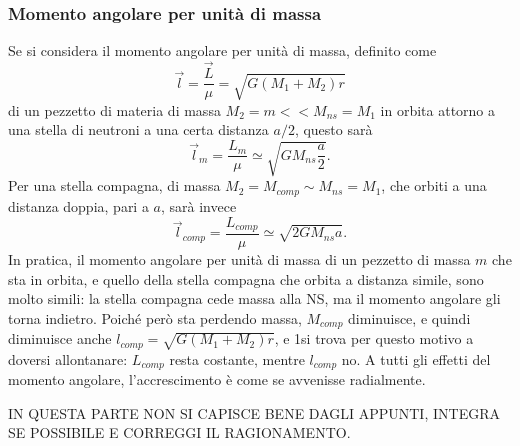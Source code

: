 \subsubsection{Momento angolare per unità di massa}
Se si considera il momento angolare per unità di massa, definito come
\begin{equation}
    \vec{l} = \frac{\vec{L}}{\mu} = \sqrt{G(M_1+M_2)r}
\end{equation}
di un pezzetto di materia di massa $M_2=m << M_{ns}=M_1$ in orbita attorno a una stella di neutroni a una certa distanza $a/2$, questo sarà
\begin{equation}
    \vec{l}_m = \frac{L_m}{\mu}\simeq \sqrt{GM_{ns}\frac{a}{2}}.
\end{equation}
Per una stella compagna, di massa $M_2 = M_{comp} \sim M_{ns} = M_1 $, che orbiti a una distanza doppia, pari a $a$, sarà invece
\begin{equation}
    \vec{l}_{comp} = \frac{L_{comp}}{\mu} \simeq \sqrt{2GM_{ns}a}.
\end{equation}
In pratica, il momento angolare per unità di massa di un pezzetto di massa $m$ che sta in orbita, e quello della stella compagna che orbita a distanza simile, sono molto simili: 
la stella compagna cede massa alla NS, ma il momento angolare gli torna indietro. Poiché però sta perdendo massa, $M_{comp}$ diminuisce, e quindi diminuisce anche $l_{comp} = \sqrt{G(M_1+M_2)r} $, e 1si trova per questo motivo a doversi allontanare: $L_{comp} $ resta costante, mentre $l_{comp} $ no.
A tutti gli effetti del momento angolare, l'accrescimento è come se avvenisse radialmente.

IN QUESTA PARTE NON SI CAPISCE BENE DAGLI APPUNTI, INTEGRA SE POSSIBILE E CORREGGI IL RAGIONAMENTO.

